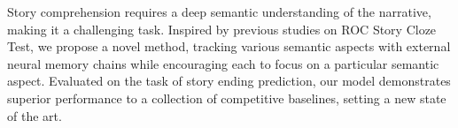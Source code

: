 Story comprehension requires a deep semantic understanding of the narrative, making it a challenging task. Inspired by previous studies on ROC Story Cloze Test, we propose a novel method, tracking various semantic aspects with external neural memory chains while encouraging each to focus on a particular semantic aspect. Evaluated on the task of story ending prediction, our model demonstrates superior performance to a collection of competitive baselines, setting a new state of the art.
